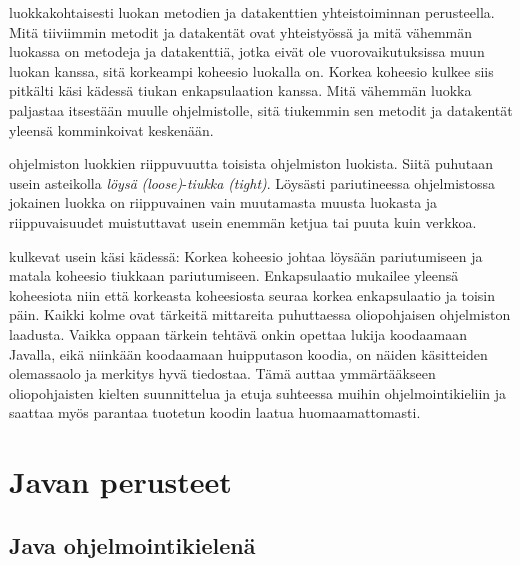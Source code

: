 \documentclass{tufte-book}
\newcommand{\eng}[1]{\textit{(#1)}}
\newcommand{\newnogls}[1]{\textit{#1}}
\newcommand{\newengnogls}[2]{\newnogls{#1} \eng{#2}}
\begin{document}
 luokkakohtaisesti luokan metodien ja datakenttien
yhteistoiminnan perusteella. Mitä tiiviimmin metodit ja datakentät ovat yhteistyössä ja mitä
vähemmän luokassa on metodeja ja datakenttiä, jotka eivät ole vuorovaikutuksissa muun luokan
kanssa, sitä korkeampi koheesio luokalla on. Korkea koheesio kulkee siis pitkälti käsi kädessä
tiukan enkapsulaation kanssa. Mitä vähemmän luokka paljastaa itsestään muulle ohjelmistolle, sitä
tiukemmin sen metodit ja datakentät yleensä komminkoivat keskenään.

 ohjelmiston luokkien riippuvuutta toisista ohjelmiston
luokista. Siitä puhutaan usein asteikolla \newengnogls{löysä}{loose}-\newengnogls{tiukka}{tight}.
Löysästi pariutineessa ohjelmistossa jokainen luokka on riippuvainen vain muutamasta muusta
luokasta ja riippuvaisuudet muistuttavat usein enemmän ketjua tai puuta kuin verkkoa.

 kulkevat usein käsi kädessä: Korkea koheesio johtaa löysään
pariutumiseen ja matala koheesio tiukkaan pariutumiseen. Enkapsulaatio mukailee yleensä koheesiota
niin että korkeasta koheesiosta seuraa korkea enkapsulaatio ja toisin päin. Kaikki kolme ovat
tärkeitä mittareita puhuttaessa oliopohjaisen ohjelmiston laadusta. Vaikka oppaan tärkein tehtävä
onkin opettaa lukija koodaamaan Javalla, eikä niinkään koodaamaan huipputason koodia, on näiden
käsitteiden olemassaolo ja merkitys hyvä tiedostaa. Tämä auttaa ymmärtääkseen oliopohjaisten
kielten suunnittelua ja etuja suhteessa muihin ohjelmointikieliin ja saattaa myös parantaa
tuotetun koodin laatua huomaamattomasti.


\chapter{Javan perusteet}
\label{perusteet}


\section{Java ohjelmointikielenä}
\label{javasta}
\end{document}
